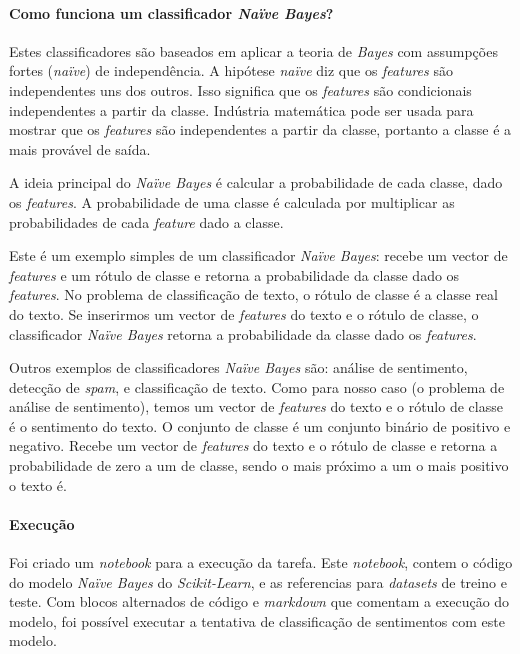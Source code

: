 \paragraph{Como funciona um classificador \textit{Naïve Bayes}?}

Estes classificadores são baseados em aplicar a teoria de \textit{Bayes} com assumpções fortes (\textit{naïve}) de independência. A hipótese \textit{naïve} diz que os \textit{features} são independentes uns dos outros. Isso significa que os \textit{features} são condicionais independentes a partir da classe. Indústria matemática pode ser usada para mostrar que os \textit{features} são independentes a partir da classe, portanto a classe é a mais provável de saída.

A ideia principal do \textit{Naïve Bayes} é calcular a probabilidade de cada classe, dado os \textit{features}. A probabilidade de uma classe é calculada por multiplicar as probabilidades de cada \textit{feature} dado a classe.

Este é um exemplo simples de um classificador \textit{Naïve Bayes}: recebe um vector de \textit{features} e um rótulo de classe e retorna a probabilidade da classe dado os \textit{features}. No problema de classificação de texto, o rótulo de classe é a classe real do texto. Se inserirmos um vector de \textit{features} do texto e o rótulo de classe, o classificador \textit{Naïve Bayes} retorna a probabilidade da classe dado os \textit{features}.

Outros exemplos de classificadores \textit{Naïve Bayes} são: análise de sentimento, detecção de \textit{spam}, e classificação de texto. Como para nosso caso (o problema de análise de sentimento), temos um vector de \textit{features} do texto e o rótulo de classe é o sentimento do texto. O conjunto de classe é um conjunto binário de positivo e negativo. Recebe um vector de \textit{features} do texto e o rótulo de classe e retorna a probabilidade de zero a um de classe, sendo o mais próximo a um o mais positivo o texto é.

\paragraph{Execução\\}

Foi criado um \textit{notebook} para a execução da tarefa. Este \textit{notebook}, contem o código do modelo \textit{Naïve Bayes} do \textit{Scikit-Learn}, e as referencias para \textit{datasets} de treino e teste. Com blocos alternados de código e \textit{markdown} que comentam a execução do modelo, foi possível executar a tentativa de classificação de sentimentos com este modelo.

